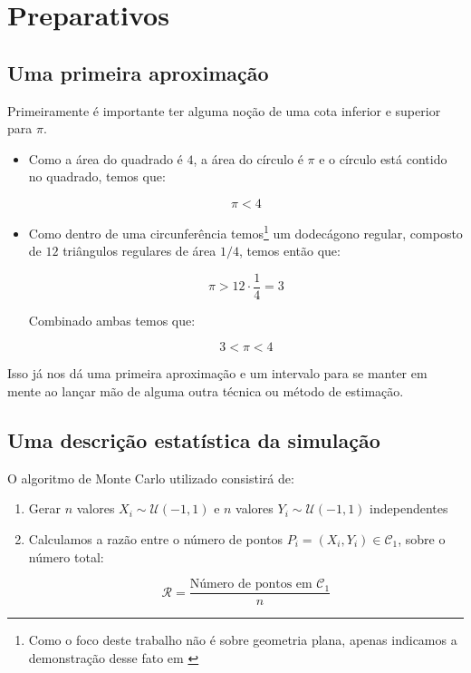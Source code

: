 \documentclass[paper=a4wide, fontsize=10pt]{scrartcl}	 %
\begin{document}
\section{Preparativos}

\subsection{Uma primeira aproximação}

    Primeiramente é importante ter alguma noção de uma cota inferior e superior para \(\pi\).

    \begin{itemize}
        \item 
        Como a área do quadrado é \(4\), a área do círculo é \(\pi\) e o círculo está contido no quadrado, temos que:

        \[
        \pi < 4
        \]
        
        \item
        Como dentro de uma circunferência temos\footnote{Como o foco deste trabalho não é sobre geometria plana, apenas indicamos a demonstração desse fato em \cite{dolce2013fundamentos}} um dodecágono regular, composto de \(12\) triângulos regulares de área \(1/4\), temos então que:

        \[
        \pi > 12 \cdot \frac{1}{4} = 3
        \]

        Combinado ambas temos que:

        \[
        3<\pi<4
        \]
        
    \end{itemize}

Isso já nos dá uma primeira aproximação e um intervalo para se manter em mente ao lançar mão de alguma outra técnica ou método de estimação.

\subsection{Uma descrição estatística da simulação}

O algoritmo de Monte Carlo utilizado consistirá de:

\begin{enumerate}
    \item Gerar \(n\) valores \(X_i \sim \mathcal{U}(-1,1)\) e \(n\) valores \(Y_i \sim \mathcal{U}(-1,1)\) independentes
    \item Calculamos a razão entre o número de pontos \(P_i = (X_i,Y_i) \in \mathcal{C}_1\), sobre o número total:

    \[
    \mathcal{R} = \frac{\text{Número de pontos em \(\mathcal{C}_1\)}}{n} 
    \]

\end{enumerate}
\end{document}
